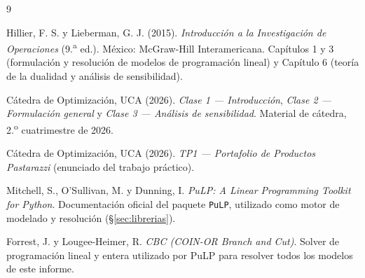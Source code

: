 \documentclass[10pt,a4paper]{article}
\begin{document}
\renewcommand{\refname}{Bibliografía}

\begin{thebibliography}{9}

 Hillier, F. S. y Lieberman, G. J. (2015).
  \emph{Introducción a la Investigación de Operaciones} (9.\textsuperscript{a}
  ed.). México: McGraw-Hill Interamericana. Capítulos 1 y 3 (formulación y
  resolución de modelos de programación lineal) y Capítulo 6 (teoría de la
  dualidad y análisis de sensibilidad).

 Cátedra de Optimización, UCA
  (2026). \emph{Clase 1 — Introducción}, \emph{Clase 2 — Formulación general}
  y \emph{Clase 3 — Análisis de sensibilidad}. Material de cátedra, 2.\textsuperscript{o}
  cuatrimestre de 2026.

 Cátedra de Optimización, UCA
  (2026). \emph{TP1 — Portafolio de Productos Pastarazzi} (enunciado del
  trabajo práctico).

 Mitchell, S., O'Sullivan, M. y Dunning, I. \emph{PuLP: A Linear
  Programming Toolkit for Python}. Documentación oficial del paquete
  \texttt{PuLP}, utilizado como motor de modelado y resolución
  (\S\ref{sec:librerias}).

 Forrest, J. y Lougee-Heimer, R. \emph{CBC (COIN-OR Branch and Cut)}.
  Solver de programación lineal y entera utilizado por PuLP para resolver
  todos los modelos de este informe.

\end{thebibliography}
\end{document}
